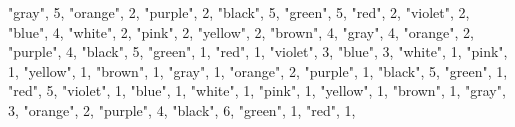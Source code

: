 \documentclass[
]{article}
\newenvironment{Shaded}{\begin{snugshade}}{\end{snugshade}}
\newcommand{\DecValTok}[1]{\textcolor[rgb]{0.00,0.00,0.81}{#1}}
\newcommand{\NormalTok}[1]{#1}
\newcommand{\StringTok}[1]{\textcolor[rgb]{0.31,0.60,0.02}{#1}}
\begin{document}
\begin{Shaded}
\begin{Highlighting}[]
  \StringTok{"gray"}\NormalTok{, }\DecValTok{5}\NormalTok{,}
  \StringTok{"orange"}\NormalTok{, }\DecValTok{2}\NormalTok{,}
  \StringTok{"purple"}\NormalTok{, }\DecValTok{2}\NormalTok{,}
    \StringTok{"black"}\NormalTok{, }\DecValTok{5}\NormalTok{,}
  \StringTok{"green"}\NormalTok{, }\DecValTok{5}\NormalTok{,}
  \StringTok{"red"}\NormalTok{, }\DecValTok{2}\NormalTok{,}
  \StringTok{"violet"}\NormalTok{, }\DecValTok{2}\NormalTok{,}
  \StringTok{"blue"}\NormalTok{, }\DecValTok{4}\NormalTok{,}
  \StringTok{"white"}\NormalTok{, }\DecValTok{2}\NormalTok{,}
  \StringTok{"pink"}\NormalTok{, }\DecValTok{2}\NormalTok{,}
  \StringTok{"yellow"}\NormalTok{, }\DecValTok{2}\NormalTok{,}
  \StringTok{"brown"}\NormalTok{, }\DecValTok{4}\NormalTok{,}
  \StringTok{"gray"}\NormalTok{, }\DecValTok{4}\NormalTok{,}
  \StringTok{"orange"}\NormalTok{, }\DecValTok{2}\NormalTok{,}
  \StringTok{"purple"}\NormalTok{, }\DecValTok{4}\NormalTok{,}
    \StringTok{"black"}\NormalTok{, }\DecValTok{5}\NormalTok{,}
  \StringTok{"green"}\NormalTok{, }\DecValTok{1}\NormalTok{,}
  \StringTok{"red"}\NormalTok{, }\DecValTok{1}\NormalTok{,}
  \StringTok{"violet"}\NormalTok{, }\DecValTok{3}\NormalTok{,}
  \StringTok{"blue"}\NormalTok{, }\DecValTok{3}\NormalTok{,}
  \StringTok{"white"}\NormalTok{, }\DecValTok{1}\NormalTok{,}
  \StringTok{"pink"}\NormalTok{, }\DecValTok{1}\NormalTok{,}
  \StringTok{"yellow"}\NormalTok{, }\DecValTok{1}\NormalTok{,}
  \StringTok{"brown"}\NormalTok{, }\DecValTok{1}\NormalTok{,}
  \StringTok{"gray"}\NormalTok{, }\DecValTok{1}\NormalTok{,}
  \StringTok{"orange"}\NormalTok{, }\DecValTok{2}\NormalTok{,}
  \StringTok{"purple"}\NormalTok{, }\DecValTok{1}\NormalTok{,}
    \StringTok{"black"}\NormalTok{, }\DecValTok{5}\NormalTok{,}
  \StringTok{"green"}\NormalTok{, }\DecValTok{1}\NormalTok{,}
  \StringTok{"red"}\NormalTok{, }\DecValTok{5}\NormalTok{,}
  \StringTok{"violet"}\NormalTok{, }\DecValTok{1}\NormalTok{,}
  \StringTok{"blue"}\NormalTok{, }\DecValTok{1}\NormalTok{,}
  \StringTok{"white"}\NormalTok{, }\DecValTok{1}\NormalTok{, }
  \StringTok{"pink"}\NormalTok{, }\DecValTok{1}\NormalTok{,}
  \StringTok{"yellow"}\NormalTok{, }\DecValTok{1}\NormalTok{,}
  \StringTok{"brown"}\NormalTok{, }\DecValTok{1}\NormalTok{,}
  \StringTok{"gray"}\NormalTok{, }\DecValTok{3}\NormalTok{,}
  \StringTok{"orange"}\NormalTok{, }\DecValTok{2}\NormalTok{,}
  \StringTok{"purple"}\NormalTok{, }\DecValTok{4}\NormalTok{,}
    \StringTok{"black"}\NormalTok{, }\DecValTok{6}\NormalTok{,}
  \StringTok{"green"}\NormalTok{, }\DecValTok{1}\NormalTok{,}
  \StringTok{"red"}\NormalTok{, }\DecValTok{1}\NormalTok{,}

\end{Highlighting}
\end{Shaded}
\end{document}
